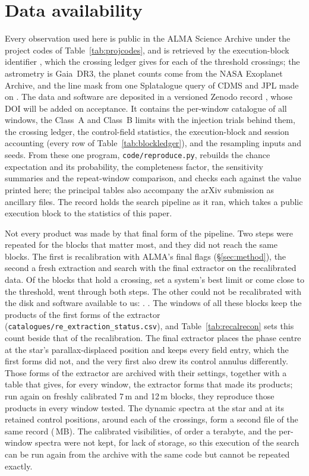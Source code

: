 \section*{Data availability}
\label{sec:data}
Every observation used here is public in the ALMA Science Archive under the
\NProjCodes{} project codes of Table~\ref{tab:projcodes}, and is retrieved by
the execution-block identifier \citep{Chen2022}, which the crossing ledger
gives for each of the \EvNCrossRaw{} threshold crossings; the astrometry is
Gaia~DR3, the planet counts come from the NASA Exoplanet Archive, and the line
mask from one Splatalogue query of CDMS and JPL made on \McQueryDate. The data
and software are deposited in a versioned Zenodo record \citep{SIdeposit},
whose DOI will be added on acceptance. It
contains the per-window catalogue of all \NWindows{} windows, the Class~A and
Class~B limits with the injection trials behind them, the crossing ledger, the
control-field statistics, the execution-block and session accounting (every
row of Table~\ref{tab:blockledger}), and the
resampling inputs and seeds. From these one program,
\texttt{code/reproduce.py}, rebuilds the chance expectation and its
probability, the completeness factor, the sensitivity summaries and the
repeat-window comparison, and checks each against the value printed here; the
principal tables also accompany the arXiv submission as ancillary files. The
record holds the search pipeline as it ran, which takes a public execution
block to the statistics of this paper.

Not every product was made by that final form of the pipeline. Two steps
were repeated for the blocks that matter most, and they did not reach the
same blocks. The first is recalibration with ALMA's final flags
(\S\ref{sec:method}), the second a fresh extraction and search with the
final extractor on the recalibrated data. Of
the \XgNBlkPlan{} blocks that hold a crossing, set a system's best limit or
come close to the threshold, \XgNBlkReDone{} went through both steps. The
other \XgNBlkNotRe{} could not be recalibrated with the disk and software
available to us: \XgNotReClause. \LrNotReClause. The windows of all these blocks keep
the products of the first forms of the extractor
(\texttt{catalogues/\allowbreak re\_extraction\_status.csv}), and
Table~\ref{tab:recalrecon} sets this count beside that of the
recalibration. The final extractor places the phase
centre at the star's parallax-displaced position and keeps every field entry,
which the first forms did not, and the very first also drew its control
annulus differently. Those forms of the extractor are archived with their settings,
together with a table that gives, for every window, the extractor forms that made
its products; run again on freshly calibrated 7\,m and 12\,m blocks, they
reproduce those products in every window tested. The dynamic spectra at the
star and at its \RcNRetCtrl{} retained control positions, around each of the
\DaNSpecCross{} crossings, form a second file of the same record
(\DaSpecFileMB\,MB). The calibrated visibilities, of order a terabyte, and the
per-window spectra were not kept, for lack of storage, so this execution of
the search can be run again from the archive with the same code but cannot be
repeated exactly.
